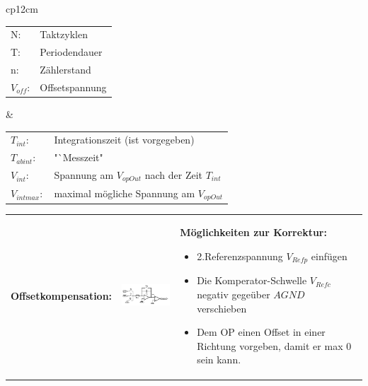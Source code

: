   \begin{longtable}{cp{12cm}}
 
  \begin{tabular}{ll}
    N:&Taktzyklen\\
    T:&Periodendauer\\
    n:&Zählerstand\\
    $V_{off}$:&Offsetspannung\\
  \end{tabular} &
  
  \begin{tabular}{ll}
    $T_{int}$:&Integrationszeit (ist vorgegeben)\\
    $T_{abint}$:& "`Messzeit"\\
    $V_{int}$:&Spannung am $V_{opOut}$ nach der Zeit $T_{int}$\\
    $V_{intmax}:$&maximal mögliche Spannung am $V_{opOut}$\\
  \end{tabular}
\end{longtable}

\begin{longtable}{p{4cm}p{6cm}p{8cm}}
  \textbf{Offsetkompensation:} &
  \includegraphics[width=6cm, valign=t]{images/offsetkompensation} &
  \textbf{Möglichkeiten zur Korrektur:}
  \begin{itemize}
    \item 2.Referenzspannung $V_{Refp}$ einfügen
    \item Die Komperator-Schwelle $V_{Refc}$ negativ gegeüber $AGND$ verschieben
    \item Dem OP einen Offset in einer Richtung vorgeben, damit er max 0 sein kann.
  \end{itemize}
\end{longtable}

